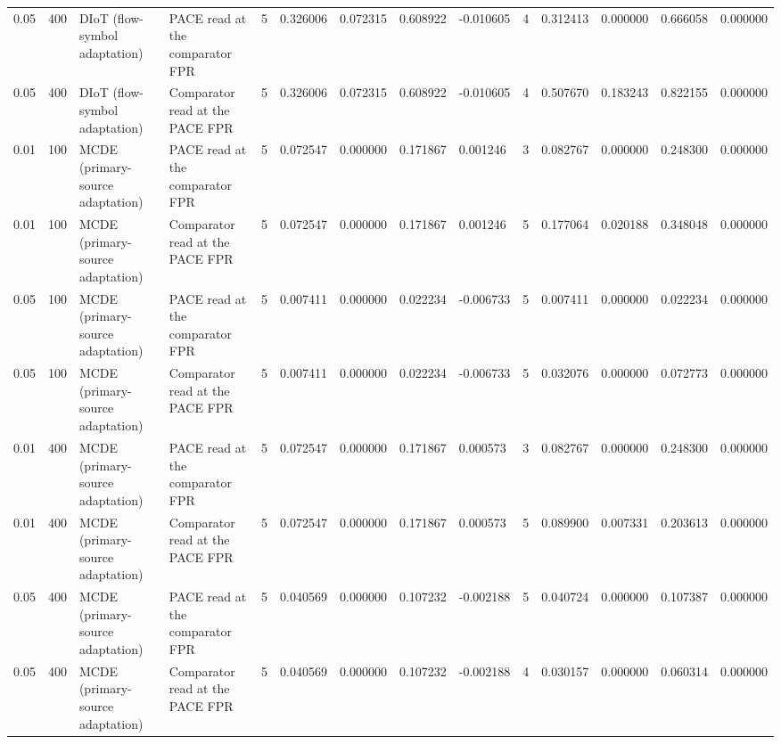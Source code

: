 \begin{tabular}{llllllllllllll}
0.05 & 400 & DIoT (flow-symbol adaptation) & PACE read at the comparator FPR & 5 & 0.326006 & 0.072315 & 0.608922 & -0.010605 & 4 & 0.312413 & 0.000000 & 0.666058 & 0.000000 \\
0.05 & 400 & DIoT (flow-symbol adaptation) & Comparator read at the PACE FPR & 5 & 0.326006 & 0.072315 & 0.608922 & -0.010605 & 4 & 0.507670 & 0.183243 & 0.822155 & 0.000000 \\
0.01 & 100 & MCDE (primary-source adaptation) & PACE read at the comparator FPR & 5 & 0.072547 & 0.000000 & 0.171867 & 0.001246 & 3 & 0.082767 & 0.000000 & 0.248300 & 0.000000 \\
0.01 & 100 & MCDE (primary-source adaptation) & Comparator read at the PACE FPR & 5 & 0.072547 & 0.000000 & 0.171867 & 0.001246 & 5 & 0.177064 & 0.020188 & 0.348048 & 0.000000 \\
0.05 & 100 & MCDE (primary-source adaptation) & PACE read at the comparator FPR & 5 & 0.007411 & 0.000000 & 0.022234 & -0.006733 & 5 & 0.007411 & 0.000000 & 0.022234 & 0.000000 \\
0.05 & 100 & MCDE (primary-source adaptation) & Comparator read at the PACE FPR & 5 & 0.007411 & 0.000000 & 0.022234 & -0.006733 & 5 & 0.032076 & 0.000000 & 0.072773 & 0.000000 \\
0.01 & 400 & MCDE (primary-source adaptation) & PACE read at the comparator FPR & 5 & 0.072547 & 0.000000 & 0.171867 & 0.000573 & 3 & 0.082767 & 0.000000 & 0.248300 & 0.000000 \\
0.01 & 400 & MCDE (primary-source adaptation) & Comparator read at the PACE FPR & 5 & 0.072547 & 0.000000 & 0.171867 & 0.000573 & 5 & 0.089900 & 0.007331 & 0.203613 & 0.000000 \\
0.05 & 400 & MCDE (primary-source adaptation) & PACE read at the comparator FPR & 5 & 0.040569 & 0.000000 & 0.107232 & -0.002188 & 5 & 0.040724 & 0.000000 & 0.107387 & 0.000000 \\
0.05 & 400 & MCDE (primary-source adaptation) & Comparator read at the PACE FPR & 5 & 0.040569 & 0.000000 & 0.107232 & -0.002188 & 4 & 0.030157 & 0.000000 & 0.060314 & 0.000000 \\
\bottomrule
\end{tabular}
